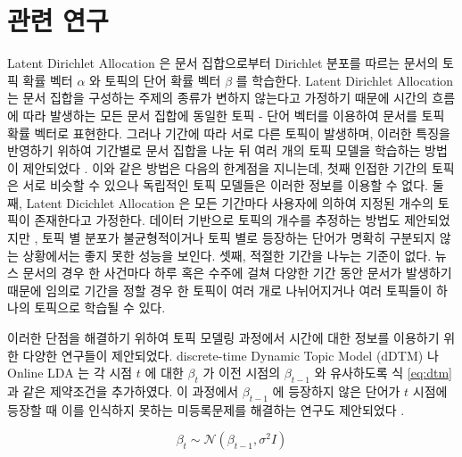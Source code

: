 \documentclass[oneside, ko,phd]{snuthesis_utf8_kor}
\begin{document}
\section{관련 연구}

Latent Dirichlet Allocation 은 문서 집합으로부터 Dirichlet 분포를 따르는 문서의 토픽 확률 벡터 $\alpha$ 와 토픽의 단어 확률 벡터 $\beta$ 를 학습한다.
Latent Dirichlet Allocation 는 문서 집합을 구성하는 주제의 종류가 변하지 않는다고 가정하기 때문에 시간의 흐름에 따라 발생하는 모든 문서 집합에 동일한 토픽 - 단어 벡터를 이용하여 문서를 토픽 확률 벡터로 표현한다.
그러나 기간에 따라 서로 다른 토픽이 발생하며, 이러한 특징을 반영하기 위하여 기간별로 문서 집합을 나눈 뒤 여러 개의 토픽 모델을 학습하는 방법이 제안되었다 \cite{blei2006dynamic, mei2007topic, alsumait2008line}.
이와 같은 방법은 다음의 한계점을 지니는데, 첫째 인접한 기간의 토픽은 서로 비슷할 수 있으나 독립적인 토픽 모델들은 이러한 정보를 이용할 수 없다.
둘째, Latent Dicichlet Allocation 은 모든 기간마다 사용자에 의하여 지정된 개수의 토픽이 존재한다고 가정한다. 
데이터 기반으로 토픽의 개수를 추정하는 방법도 제안되었지만 \cite{wang2011online}, 토픽 별 분포가 불균형적이거나 토픽 별로 등장하는 단어가 명확히 구분되지 않는 상황에서는 좋지 못한 성능을 보인다.
셋째, 적절한 기간을 나누는 기준이 없다.
뉴스 문서의 경우 한 사건마다 하루 혹은 수주에 걸쳐 다양한 기간 동안 문서가 발생하기 때문에 임의로 기간을 정할 경우 한 토픽이 여러 개로 나뉘어지거나 여러 토픽들이 하나의 토픽으로 학습될 수 있다.

이러한 단점을 해결하기 위하여 토픽 모델링 과정에서 시간에 대한 정보를 이용하기 위한 다양한 연구들이 제안되었다.
discrete-time Dynamic Topic Model (dDTM) \cite{blei2006dynamic} 나 Online LDA \cite{alsumait2008line} 는 각 시점 $t$ 에 대한 $\beta_t$ 가 이전 시점의 $\beta_{t-1}$ 와 유사하도록 식 \ref{eq:dtm} 과 같은 제약조건을 추가하였다. 이 과정에서 $\beta_{t-1}$ 에 등장하지 않은 단어가 $t$ 시점에 등장할 때 이를 인식하지 못하는 미등록문제를 해결하는 연구도 제안되었다 \cite{zhai2013online}.

\begin{equation}
\label{eq:dtm}
\beta_t \sim \mathcal{N}(\beta_{t-1}, \sigma^2 \mathit{I})
\end{equation}
\end{document}
